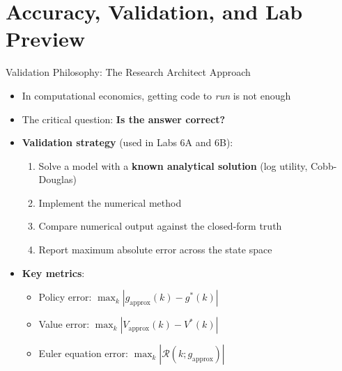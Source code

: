 \documentclass[10pt,english,aspectratio=169]{beamer}
\begin{document}
\section{Accuracy, Validation, and Lab Preview}

\begin{frame}{Validation Philosophy: The Research Architect Approach}
\begin{itemize}
  \item In computational economics, getting code to \emph{run} is not enough
  \item The critical question: \textbf{Is the answer correct?}
  \medskip
  \item \textbf{Validation strategy} (used in Labs 6A and 6B):
    \begin{enumerate}
      \item Solve a model with a \textbf{known analytical solution} (log utility, Cobb-Douglas)
      \item Implement the numerical method
      \item Compare numerical output against the closed-form truth
      \item Report maximum absolute error across the state space
    \end{enumerate}
  \medskip
  \item \textbf{Key metrics}:
    \begin{itemize}
      \item Policy error: $\max_k |g_{\text{approx}}(k) - g^*(k)|$
      \item Value error: $\max_k |V_{\text{approx}}(k) - V^*(k)|$
      \item Euler equation error: $\max_k |\mathcal{R}(k; g_{\text{approx}})|$
    \end{itemize}
\end{itemize}
\end{frame}
\end{document}
